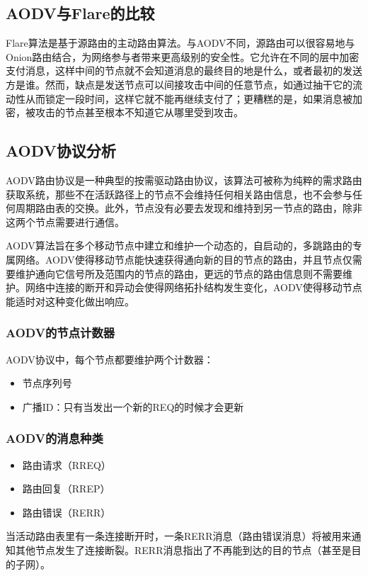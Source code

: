 \documentclass[12pt,a4paper]{article}
\begin{document}
\subsection{AODV与Flare的比较}
Flare算法是基于源路由的主动路由算法。与AODV不同，源路由可以很容易地与Onion路由结合，为网络参与者带来更高级别的安全性。它允许在不同的层中加密支付消息，这样中间的节点就不会知道消息的最终目的地是什么，或者最初的发送方是谁。然而，缺点是发送节点可以间接攻击中间的任意节点，如通过抽干它的流动性从而锁定一段时间，这样它就不能再继续支付了；更糟糕的是，如果消息被加密，被攻击的节点甚至根本不知道它从哪里受到攻击。

\subsection{AODV协议分析}
AODV路由协议\cite{cs647_aodv}是一种典型的按需驱动路由协议，该算法可被称为纯粹的需求路由获取系统，那些不在活跃路径上的节点不会维持任何相关路由信息，也不会参与任何周期路由表的交换。此外，节点没有必要去发现和维持到另一节点的路由，除非这两个节点需要进行通信。

AODV算法旨在多个移动节点中建立和维护一个动态的，自启动的，多跳路由的专属网络。AODV使得移动节点能快速获得通向新的目的节点的路由，并且节点仅需要维护通向它信号所及范围内的节点的路由，更远的节点的路由信息则不需要维护。网络中连接的断开和异动会使得网络拓扑结构发生变化，AODV使得移动节点能适时对这种变化做出响应。

\subsubsection{AODV的节点计数器}
AODV协议中，每个节点都要维护两个计数器：

\begin{itemize}
	\item 节点序列号
	\item 广播ID：只有当发出一个新的REQ的时候才会更新
\end{itemize}

\subsubsection{AODV的消息种类}
\begin{itemize}
	\item 路由请求（RREQ）
	\item 路由回复（RREP）
	\item 路由错误（RERR）
\end{itemize}
当活动路由表里有一条连接断开时，一条RERR消息（路由错误消息）将被用来通知其他节点发生了连接断裂。RERR消息指出了不再能到达的目的节点（甚至是目的子网）。
\end{document}
